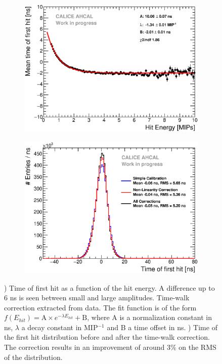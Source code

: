 \documentclass{JINST}
\begin{document}
\begin{figure}[htbp!]
  \begin{subfigure}[t]{0.49\textwidth}
    \centering
    \includegraphics[width=1\linewidth]{fig/TimeWalkProfile.eps}
    \caption{} \label{fig:time_walk}
  \end{subfigure}
  \hfill
  \begin{subfigure}[t]{0.49\textwidth}
    \centering
    \includegraphics[width=1\linewidth]{fig/Timing_AHCAL_AllCorrection.eps}
    \caption{} \label{fig:Timing_AllCorr}
  \end{subfigure}
  \caption{) Time of first hit as a function of the hit energy. A difference up to 6 ns is seen between small and large amplitudes. Time-walk correction extracted from data. The fit function is of the form $f(E_{hit}) = \text{A} \times e^{-\lambda{}E_{hit}} + \text{B}$, where A is a normalization constant in ns, $\lambda$ a decay constant in MIP$^{-1}$ and B a time offset in ns. ) Time of the first hit distribution before and after the time-walk correction. The correction results in an improvement of around 3\% on the RMS of the distribution.}
\end{figure}
\end{document}
